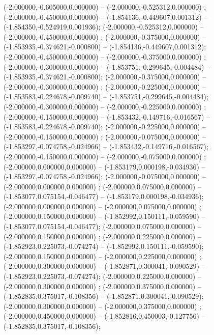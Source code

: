  (-2.000000,-0.605000,0.000000) -- (-2.000000,-0.525312,0.000000) ;
 (-2.000000,-0.450000,0.000000) -- (-1.854136,-0.449607,0.001312) -- (-1.854350,-0.524919,0.001936);
 (-2.000000,-0.525312,0.000000) -- (-2.000000,-0.450000,0.000000) ;
 (-2.000000,-0.375000,0.000000) -- (-1.853935,-0.374621,-0.000800) -- (-1.854136,-0.449607,0.001312);
 (-2.000000,-0.450000,0.000000) -- (-2.000000,-0.375000,0.000000) ;
 (-2.000000,-0.300000,0.000000) -- (-1.853751,-0.299645,-0.004484) -- (-1.853935,-0.374621,-0.000800);
 (-2.000000,-0.375000,0.000000) -- (-2.000000,-0.300000,0.000000) ;
 (-2.000000,-0.225000,0.000000) -- (-1.853583,-0.224678,-0.009740) -- (-1.853751,-0.299645,-0.004484);
 (-2.000000,-0.300000,0.000000) -- (-2.000000,-0.225000,0.000000) ;
 (-2.000000,-0.150000,0.000000) -- (-1.853432,-0.149716,-0.016567) -- (-1.853583,-0.224678,-0.009740);
 (-2.000000,-0.225000,0.000000) -- (-2.000000,-0.150000,0.000000) ;
 (-2.000000,-0.075000,0.000000) -- (-1.853297,-0.074758,-0.024966) -- (-1.853432,-0.149716,-0.016567);
 (-2.000000,-0.150000,0.000000) -- (-2.000000,-0.075000,0.000000) ;
 (-2.000000,0.000000,0.000000) -- (-1.853179,0.000198,-0.034936) -- (-1.853297,-0.074758,-0.024966);
 (-2.000000,-0.075000,0.000000) -- (-2.000000,0.000000,0.000000) ;
 (-2.000000,0.075000,0.000000) -- (-1.853077,0.075154,-0.046477) -- (-1.853179,0.000198,-0.034936);
 (-2.000000,0.000000,0.000000) -- (-2.000000,0.075000,0.000000) ;
 (-2.000000,0.150000,0.000000) -- (-1.852992,0.150111,-0.059590) -- (-1.853077,0.075154,-0.046477);
 (-2.000000,0.075000,0.000000) -- (-2.000000,0.150000,0.000000) ;
 (-2.000000,0.225000,0.000000) -- (-1.852923,0.225073,-0.074274) -- (-1.852992,0.150111,-0.059590);
 (-2.000000,0.150000,0.000000) -- (-2.000000,0.225000,0.000000) ;
 (-2.000000,0.300000,0.000000) -- (-1.852871,0.300041,-0.090529) -- (-1.852923,0.225073,-0.074274);
 (-2.000000,0.225000,0.000000) -- (-2.000000,0.300000,0.000000) ;
 (-2.000000,0.375000,0.000000) -- (-1.852835,0.375017,-0.108356) -- (-1.852871,0.300041,-0.090529);
 (-2.000000,0.300000,0.000000) -- (-2.000000,0.375000,0.000000) ;
 (-2.000000,0.450000,0.000000) -- (-1.852816,0.450003,-0.127756) -- (-1.852835,0.375017,-0.108356);
